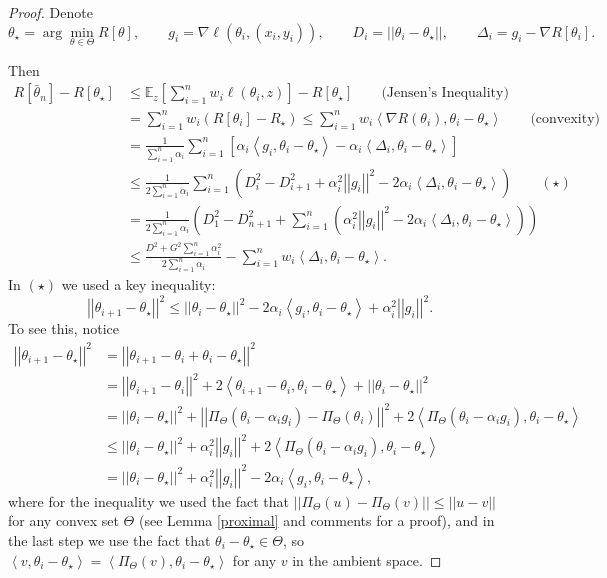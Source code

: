 \documentclass{article}[12pt]
\def\E{\mathbb{E}}
\newcommand{\norm}[1]{\left|\left|#1\right|\right|}
\newcommand{\innprod}[2]{\left\langle#1, #2\right\rangle}
\def \E{\mathbb{E}}
\begin{document}
\begin{proof}
Denote 
\[
   \theta_\star = \arg\min_{\theta \in \Theta} R[\theta], \qquad g_i = \nabla \ell(\theta_i, (x_i, y_i)), \qquad D_i = \norm{\theta_i - \theta_\star}, \qquad \Delta_i = g_i - \nabla R[\theta_i].
\]

Then 
\begin{align*}
   R[\bar{\theta}_n] - R[\theta_\star] &\leq \E_z \left[ \sum_{i=1}^n  w_i \ell \left( \theta_i, z \right) \right] - R[\theta_\star]  \qquad \text{(Jensen's Inequality)}\\
   &= \sum_{i = 1}^{n} w_i(R[\theta_i] - R_{\star}) 
   \leq \sum_{i = 1}^{n} w_i \innprod{\nabla R(\theta_i)}{\theta_i - \theta_\star} \qquad \text{(convexity)} \\
   &= \frac{1}{\sum_{i=1}^n \alpha_i} \sum_{i = 1}^{n} [\alpha_i \innprod{g_i}{\theta_i-\theta_\star} - \alpha_i \innprod{\Delta_i}{\theta_i - \theta_\star}] \\
   &\leq \frac{1}{2\sum_{i=1}^n \alpha_i} \sum_{i=1}^n \left( D_i^2 - D_{i+1}^2 + \alpha_i^2 \norm{g_i}^2 - 2\alpha_i \innprod{\Delta_i}{\theta_i - \theta_\star} \right) \qquad (\star) \\
   &= \frac{1}{2\sum_{i=1}^n \alpha_i} \left( D_1^2 - D_{n+1}^2 + \sum_{i=1}^n \left( \alpha_i^2 \norm{g_i}^2 - 2\alpha_i \innprod{\Delta_i}{\theta_i - \theta_\star} \right) \right) \\
   &\leq \frac{D^2 + G^2 \sum_{i=1}^n \alpha_i^2}{2\sum_{i=1}^n \alpha_i} - \sum_{i = 1}^{n} w_i \innprod{\Delta_i}{\theta_i - \theta_\star}.
\end{align*}
In $(\star)$ we used a key inequality:
\[
\norm{\theta_{i+1} - \theta_\star}^2 \leq \norm{\theta_i - \theta_\star}^2 - 2\alpha_i \innprod{g_i}{\theta_i - \theta_\star} + \alpha_i^2 \norm{g_i}^2. 
\]
To see this, notice 
\begin{align*}
\norm{\theta_{i+1} - \theta_\star}^2  &= \norm{\theta_{i+1} - \theta_i + \theta_i - \theta_\star}^2 \\
&= \norm{\theta_{i+1} - \theta_i}^2 + 2\innprod{\theta_{i+1} - \theta_i}{\theta_i - \theta_\star} + \norm{\theta_i - \theta_\star}^2 \\
&= \norm{\theta_i - \theta_\star}^2 + \norm{\Pi_\Theta(\theta_i - \alpha_i g_i) - \Pi_\Theta(\theta_i)}^2 + 2 \innprod{\Pi_\Theta(\theta_i - \alpha_i g_i)}{\theta_i - \theta_\star} \\
&\leq \norm{\theta_i - \theta_\star}^2 + \alpha_i^2 \norm{g_i}^2 + 2 \innprod{\Pi_\Theta(\theta_i - \alpha_i g_i)}{\theta_i - \theta_\star}  \\
&= \norm{\theta_i - \theta_\star}^2 + \alpha_i^2 \norm{g_i}^2 - 2 \alpha_i \innprod{g_i}{\theta_i - \theta_\star}, 
\end{align*}
where for the inequality we used the fact that $\norm{\Pi_{\Theta}(u) - \Pi_\Theta(v)}\leq \norm{u - v}$ for any convex set $\Theta$ (see Lemma \ref{proximal} and comments for a proof), and in the last step we use the fact that $\theta_i - \theta_\star \in \Theta$, so $\innprod{v}{\theta_i - \theta_\star} = \innprod{\Pi_{\Theta}(v)}{\theta_i - \theta_\star}$ for any $v$ in the ambient space.


\end{proof}
\end{document}
